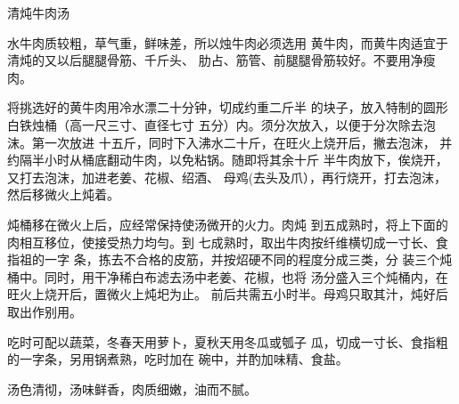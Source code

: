 \begin{recipe}{清炖牛肉汤}

\ingredients



\cooking

水牛肉质较粗，草气重，鲜味差，所以烛牛肉必须选用 黄牛肉，而黄牛肉适宜于清炖的又以后腿腿骨筋、千斤头、 肋占、筋管、前腿腿骨筋较好。不要用净瘦肉。

将挑选好的黄牛肉用冷水漂二十分钟，切成约重二斤半 的块子，放入特制的圆形白铁烛桶（高一尺三寸、直径七寸 五分）内。须分次放入，以便于分次除去泡沫。第一次放进 十五斤，同时下入沸水二十斤，在旺火上烧开后，撇去泡沫， 并约隔半小时从桶底翻动牛肉，以免粘锅。随即将其余十斤 半牛肉放下，俟烧开，又打去泡沫，加进老姜、花椒、绍酒、 母鸡(去头及爪），再行烧开，打去泡沫，然后移微火上炖着。

炖桶移在微火上后，应经常保持使汤微开的火力。肉炖 到五成熟时，将上下面的肉相互移位，使接受热力均勻。到 七成熟时，取出牛肉按纤维横切成一寸长、食指祖的一字 条，拣去不合格的皮筋，并按炤硬不同的程度分成三类，分 装三个炖桶中。同时，用干净稀白布滤去汤中老姜、花椒，也将 汤分盛入三个炖桶内，在旺火上烧开后，置微火上炖圯为止。 前后共需五小时半。母鸡只取其汁，炖好后取出作别用。

吃时可配以蔬菜，冬春天用萝卜，夏秋天用冬瓜或瓠子 瓜，切成一寸长、食指粗的一字条，另用锅煮熟，吃时加在 碗中，并酌加味精、食盐。

\notes

汤色清彻，汤味鲜香，肉质细嫩，油而不腻。

\end{recipe}

